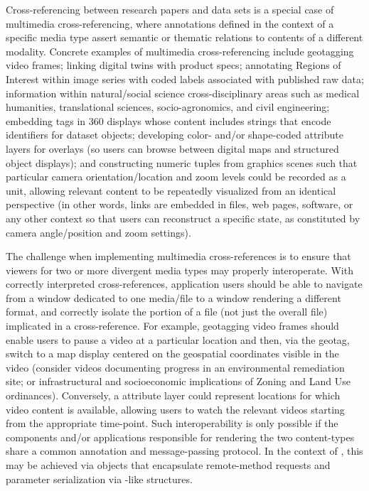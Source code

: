 \documentclass[11pt]{article}
\begin{document}
{{\begin{description}
\pseudoIndent{} Cross-referencing between research papers and data sets 
is a special case of multimedia cross-referencing, where annotations defined 
in the context of a specific media type assert semantic or thematic 
relations to contents of a different modality.  Concrete examples 
of multimedia cross-referencing include geotagging video frames; linking 
\CAD{} digital twins with product specs; annotating Regions of Interest 
within image series with coded labels associated with published raw data; 
information within natural/social science cross-disciplinary areas such as medical 
humanities, translational sciences, socio-agronomics, and civil engineering;
embedding tags in 360\textdegree{} displays whose content includes 
\URL{} strings that encode identifiers for dataset objects; developing 
color- and/or shape-coded attribute layers for \GIS{} overlays (so users 
can browse between digital maps and structured object 
displays); and constructing numeric tuples from \ThreeD{} graphics scenes 
such that particular camera orientation/location and zoom levels 
could be recorded as a unit, allowing relevant \ThreeD{} content to be 
repeatedly visualized from an identical perspective (in other words, 
links are embedded in \PDF{} files, web pages, software, or any 
other context so that users can reconstruct a specific \ThreeD{} state, 
as constituted by camera angle/position and zoom settings).

\pseudoIndent{}  The challenge when implementing multimedia cross-references is to 
ensure that viewers for two or more divergent media types may properly 
interoperate.  With correctly interpreted cross-references, application users should be able 
to navigate from a window dedicated to one media/file to a 
window rendering a different format, and correctly isolate the 
portion of a file (not just the overall file) implicated in a cross-reference.  
For example, geotagging video frames should enable users to pause a video 
at a particular location and then, via the geotag, switch to a map 
display centered on the geospatial coordinates visible in the video 
(consider videos documenting progress in an environmental 
remediation site; or infrastructural and socioeconomic implications of 
Zoning and Land Use ordinances).  Conversely, a \GIS{} attribute layer could represent 
locations for which video content is available, allowing users 
to watch the relevant videos starting from the appropriate time-point.  
Such interoperability is only possible if the components and/or applications 
responsible for rendering the two content-types share a common 
annotation and message-passing protocol.  In the context of \PacTk{}, 
this may be achieved via \TSOM{}  objects that encapsulate 
remote-method requests and parameter serialization via 
\TagML{}-like structures.
 


\end{description}}}
\end{document}
